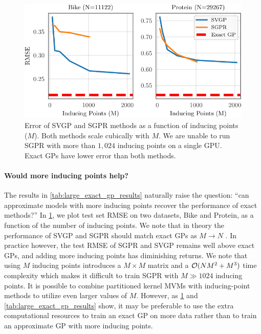 \begin{figure}[!t]
  \centering
  \includegraphics[width=0.7\linewidth]{figures/inducing_points.pdf}
  \caption[Error of approximate GP methods as a function of inducing points.]{
    Error of SVGP and SGPR methods as a function of inducing points ($M$).
    Both methods scale cubically with $M$.
    We are unable to run SGPR with more than $1,\!024$ inducing points on a single GPU.
    Exact GPs have lower error than both methods.
  }
  \label{fig:num_inducing_points}
\end{figure}

\paragraph{Would more inducing points help?}
The results in \cref{tab:large_exact_gp_results} naturally raise the question: ``can approximate models with more inducing points recover the performance of exact methods?''
In \cref{fig:num_inducing_points}, we plot test set RMSE on two datasets, Bike and Protein, as a function of the number of inducing points.
We note that in theory the performance of SVGP and SGPR should match exact GPs as $M \rightarrow N$ \cite{titsias2009variational,hensman2013gaussian}.
In practice however, the test RMSE of SGPR and SVGP remains well above exact GPs, and adding more inducing points has diminishing returns.
We note that using $M$ inducing points introduces a $M \times M$ matrix and a $\bigo{NM^2 + M^3}$ time complexity which makes it difficult to train SGPR with $M \gg 1024$ inducing points.
It is possible to combine partitioned kernel MVMs with inducing-point methods to utilize even larger values of $M$.
However, as \cref{fig:num_inducing_points} and \cref{tab:large_exact_gp_results} show, it may be preferable to use the extra computational resources to train an exact GP on more data rather than to train an approximate GP with more inducing points.
